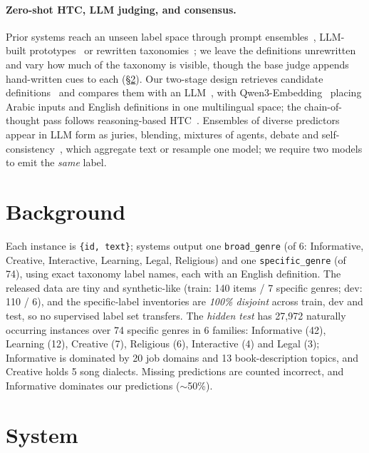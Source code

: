 \documentclass[11pt]{article}
\begin{document}
\paragraph{Zero-shot HTC, LLM judging, and consensus.} Prior systems reach an unseen label
space through prompt ensembles~\citep{xia2025hieps}, LLM-built
prototypes~\citep{zhang2024hierprompt} or rewritten taxonomies~\citep{golde2026refined}; we
leave the definitions unrewritten and vary how much of the taxonomy is visible, though the base
judge appends hand-written cues to each (\S\ref{sec:system}). Our two-stage design retrieves
candidate definitions~\citep{chen2024retrieval} and compares them with an
LLM~\citep{sun2023rankgpt,zheng2023judging}, with Qwen3-Embedding~\citep{qwen3embedding2025}
placing Arabic inputs and English definitions in one multilingual space; the chain-of-thought
pass follows reasoning-based HTC~\citep{jiang2026reasoning}. Ensembles of diverse
predictors~\citep{dietterich2000ensemble} appear in LLM form as juries, blending, mixtures of
agents, debate and
self-consistency~\citep{verga2024poll,jiang2023llmblender,wang2024moa,du2023debate,wang2023selfconsistency},
which aggregate text or resample one model; we require two models to emit the \emph{same}
label.

\section{Background}
Each instance is \texttt{\{id, text\}}; systems output one \texttt{broad\_genre} (of 6:
Informative, Creative, Interactive, Learning, Legal, Religious) and one
\texttt{specific\_genre} (of 74), using exact taxonomy label names, each with an English
definition. The released data are tiny and synthetic-like (train: 140 items / 7 specific genres;
dev: 110 / 6), and the specific-label inventories are \emph{100\% disjoint} across train, dev
and test, so no supervised label set transfers. The \emph{hidden test} has 27{,}972 naturally
occurring instances over 74 specific genres in 6 families: Informative (42), Learning (12),
Creative (7), Religious (6), Interactive (4) and Legal (3); Informative is dominated by 20 job
domains and 13 book-description topics, and Creative holds 5 song dialects. Missing predictions
are counted incorrect, and Informative dominates our predictions ($\sim$50\%).

\section{System}
\label{sec:system}
\end{document}
